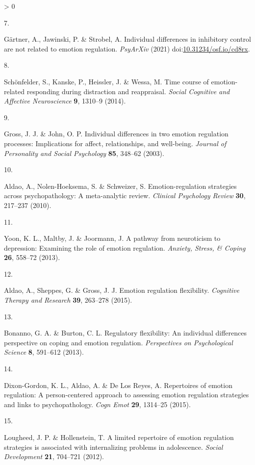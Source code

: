 \documentclass[
  english,
  man,floatsintext]{apa6}
\newlength{\cslhangindent}
\newlength{\csllabelwidth}
\newenvironment{CSLReferences}[2] %
 {%
  \setlength{\parindent}{0pt}
  \ifodd #1 \everypar{\setlength{\hangindent}{\cslhangindent}}\ignorespaces\fi
  \ifnum #2 > 0
  \setlength{\parskip}{#2\baselineskip}
  \fi
 }%
 {}
\newcommand{\CSLLeftMargin}[1]{\parbox[t]{\csllabelwidth}{#1}}
\newcommand{\CSLRightInline}[1]{\parbox[t]{\linewidth - \csllabelwidth}{#1}\break}
\begin{document}
\begin{CSLReferences}{0}{0}
\leavevmode\hypertarget{ref-Gaertner2021}{}%
\CSLLeftMargin{7. }
\CSLRightInline{Gärtner, A., Jawinski, P. \& Strobel, A. Individual differences in inhibitory control are not related to emotion regulation. \emph{PsyArXiv} (2021) doi:\href{https://doi.org/10.31234/osf.io/cd8rx}{10.31234/osf.io/cd8rx}.}

\leavevmode\hypertarget{ref-Schoenfelder2014}{}%
\CSLLeftMargin{8. }
\CSLRightInline{Schönfelder, S., Kanske, P., Heissler, J. \& Wessa, M. Time course of emotion-related responding during distraction and reappraisal. \emph{Social Cognitive and Affective Neuroscience} \textbf{9}, 1310--9 (2014).}

\leavevmode\hypertarget{ref-GrossJohn2003}{}%
\CSLLeftMargin{9. }
\CSLRightInline{Gross, J. J. \& John, O. P. Individual differences in two emotion regulation processes: Implications for affect, relationships, and well-being. \emph{Journal of Personality and Social Psychology} \textbf{85}, 348--62 (2003).}

\leavevmode\hypertarget{ref-Aldao2010}{}%
\CSLLeftMargin{10. }
\CSLRightInline{Aldao, A., Nolen-Hoeksema, S. \& Schweizer, S. Emotion-regulation strategies across psychopathology: A meta-analytic review. \emph{Clinical Psychology Review} \textbf{30}, 217--237 (2010).}

\leavevmode\hypertarget{ref-Yoon2013}{}%
\CSLLeftMargin{11. }
\CSLRightInline{Yoon, K. L., Maltby, J. \& Joormann, J. A pathway from neuroticism to depression: Examining the role of emotion regulation. \emph{Anxiety, Stress, \& Coping} \textbf{26}, 558--72 (2013).}

\leavevmode\hypertarget{ref-Aldao2015}{}%
\CSLLeftMargin{12. }
\CSLRightInline{Aldao, A., Sheppes, G. \& Gross, J. J. Emotion regulation flexibility. \emph{Cognitive Therapy and Research} \textbf{39}, 263--278 (2015).}

\leavevmode\hypertarget{ref-Bonanno2013}{}%
\CSLLeftMargin{13. }
\CSLRightInline{Bonanno, G. A. \& Burton, C. L. Regulatory flexibility: An individual differences perspective on coping and emotion regulation. \emph{Perspectives on Psychological Science} \textbf{8}, 591--612 (2013).}

\leavevmode\hypertarget{ref-DixonGordon2015}{}%
\CSLLeftMargin{14. }
\CSLRightInline{Dixon-Gordon, K. L., Aldao, A. \& De Los Reyes, A. Repertoires of emotion regulation: A person-centered approach to assessing emotion regulation strategies and links to psychopathology. \emph{Cogn Emot} \textbf{29}, 1314--25 (2015).}

\leavevmode\hypertarget{ref-Lougheed2012}{}%
\CSLLeftMargin{15. }
\CSLRightInline{Lougheed, J. P. \& Hollenstein, T. A limited repertoire of emotion regulation strategies is associated with internalizing problems in adolescence. \emph{Social Development} \textbf{21}, 704--721 (2012).}


\end{CSLReferences}
\end{document}

